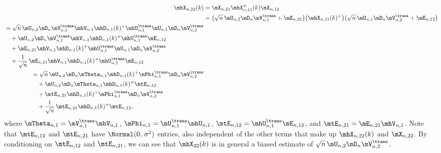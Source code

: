 \begin{align*}
    \mhX_{n,22}(k)
        &=
            \mX_{n,21} \mhX_{n,11}^{+}(k) \mX_{n,12} \\
        &=
            \big(
                \sqrt{n} \, \mU_{n,2} \mD_n \mV_{n,1}^\trans 
                + \mE_{n,21}
            \big)
            \big(
                \mhX_{n,11}(k)^+
            \big)
            \big(
                \sqrt{n} \, \mU_{n,1} \mD_n \mV_{n,2}^\trans 
                + \mE_{n,12}
            \big) \\
    \begin{split}
        &= 
            \sqrt{n} \, \mU_{n,2} \mD_n \mV_{n,1}^\trans
                \mhV_{n,1} \mhD_{n,1}(k)^+ \mhU_{n,1}^\trans
                \mU_{n,1} \mD_n \mV_{n,2}^\trans \\
        &\quad+
            \mU_{n,2} \mD_n \mV_{n,1}^\trans
                \mhV_{n,1} \mhD_{n,1}(k)^+ \mhU_{n,1}^\trans
                \mE_{n,12} \\
        &\quad+
            \mE_{n,21}
                \mhV_{n,1} \mhD_{n,1}(k)^+ \mhU_{n,1}^\trans
                \mU_{n,1} \mD_n \mV_{n,2}^\trans \\
        &\quad+
            \frac{1}{\sqrt{n}} \, \mE_{n,21}
                \mhV_{n,1} \mhD_{n,1}(k)^+ \mhU_{n,1}^\trans
                \mE_{n,12}
    \end{split} \\
    \begin{split}
        &=
            \sqrt{n} \, 
                \mU_{n,2} \mD_n 
                \mTheta_{n,1} \mhD_{n,1}(k)^+ \mPhi_{n,1}^\trans
                \mD_n \mV_{n,2}^\trans \\
        &\quad+
            \mU_{n,2} \mD_n \mTheta_{n,1} \mhD_{n,1}(k)^+ \mtE_{n,12} \\
        &\quad+
            \mtE_{n,21} 
                \mhD_{n,1}(k)^+ \mPhi_{n,1}^\trans \mD_n \mV_{n,2}^\trans \\
        &\quad+
            \frac{1}{\sqrt{n}} \, \mtE_{n,21} \mhD_{n,1}(k)^+ \mtE_{n,12},
    \end{split}
\end{align*}
where 
$\mTheta_{n,1} = \mV_{n,1}^\trans \mhV_{n,1}$,
$\mPhi_{n,1}   = \mU_{n,1}^\trans \mhU_{n,1}$,
$\mtE_{n,12} = \mhU_{n,1}^\trans \mE_{n,12}$, and
$\mtE_{n,21} = \mE_{n,21} \mhV_{n,1}$.  Note that $\mtE_{n,12}$ and $\mtE_{n,21}$ have \iid $\Normal( 0 ,\, \sigma^2 )$ entries, also independent of the other terms that make up $\mhX_{n,22}(k)$ and $\mX_{n,22}$.  By conditioning on $\mtE_{n,12}$ and $\mtE_{n,21}$, we can see that $\mhX_{22}(k)$ is in general a biased estimate of $\sqrt{n} \, \mU_{n,2} \mD_n \mV_{n,2}^\trans$.

